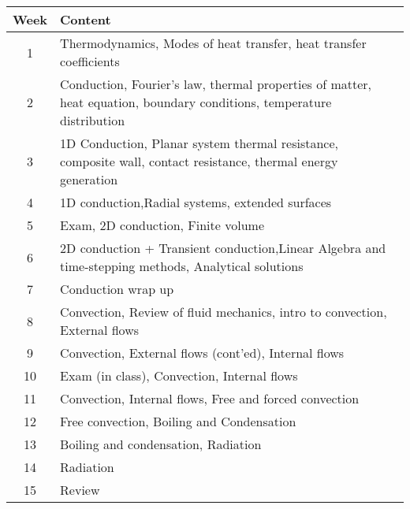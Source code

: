 \documentclass{article}%
\begin{document}
%
\begin{tabular}{|c|p{5.5in}|}%
\hline%
Week&Content\\%
\hline%
1&Thermodynamics, Modes of heat transfer, heat transfer coefficients\\%
\hline%
2&Conduction, Fourier's law,  thermal properties of matter, heat equation, boundary conditions, temperature distribution\\%
\hline%
3&1D Conduction, Planar system thermal resistance, composite wall, contact resistance, thermal energy generation\\%
\hline%
4&1D conduction,Radial systems, extended surfaces\\%
\hline%
5&Exam, 2D conduction, Finite volume\\%
\hline%
6&2D conduction + Transient conduction,Linear Algebra and time{-}stepping methods, Analytical solutions\\%
\hline%
7&Conduction wrap up\\%
\hline%
8&Convection, Review of fluid mechanics, intro to convection, External flows\\%
\hline%
9&Convection, External flows (cont'ed), Internal flows\\%
\hline%
10&Exam (in class), Convection, Internal flows\\%
\hline%
11&Convection, Internal flows, Free and forced convection\\%
\hline%
12&Free convection, Boiling and Condensation\\%
\hline%
13&Boiling and condensation, Radiation\\%
\hline%
14&Radiation\\%
\hline%
15&Review\\%
\hline%
\end{tabular}

%
\end{document}
